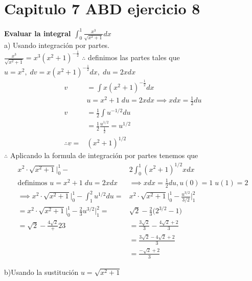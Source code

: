 \chapter*{Capitulo 7 ABD ejercicio 8}
\textbf{Evaluar la integral $\displaystyle\int_{0}^{1}\frac{x^3}{\sqrt{x^2+1}}dx$}\\
a) Usando integración por partes.\\
$\displaystyle\frac{x^3}{\sqrt{x^2+1}}=x^3(x^2+1)^{-\frac{1}{2}}$
$\therefore$ definimos las partes tales que
$u=x^2,\;dv=x(x^2+1)^{-\frac{1}{2}}dx,\;du = 2xdx $
\begin{align*}
	v             & =\int x(x^2+1)^{-\frac{1}{2}}dx                 \\
	              & u=x^2+1\; du=2xdx\implies xdx=\frac{1}{2}du     \\
	v             & =\frac{1}{2}\int u^{-1/2}du                     \\
	              & =\frac{1}{2}\frac{u^{1/2}}{\frac{1}{2}}=u^{1/2} \\
	\therefore v= & (x^2+1)^{1/2}
\end{align*}
$\therefore$ Aplicando la formula de integración por partes tenemos que
\begin{align*}
	x^2\cdot \sqrt{x^2 +1}\bigg|^1_0-                                & 2\int_{0}^{1}(x^2 +1)^{1/2}xdx                                 \\
	\text{definimos }u=x^2+1\; du=2xdx                               & \implies xdx=\frac{1}{2}du, u(0)=1\;u(1)=2                     \\
	\implies x^2\cdot \sqrt{x^2 +1}\bigg|^1_0-\int_{1}^{2}u^{1/2}du= & x^2\cdot \sqrt{x^2 +1}\bigg|^1_0-\frac{u^{3/2}}{3/2}\bigg|_1^2 \\
	=x^2\cdot \sqrt{x^2 +1}\bigg|^1_0-\frac{2}{3}u^{3/2}\bigg|_1^2=  & \sqrt{2}-\frac{2}{3}\bigg(2^{3/2}-1\bigg)                      \\
	=\sqrt{2}-\frac{4\sqrt{2}}+2{3}                                  & =\frac{3\sqrt{2}}{3}-\frac{4\sqrt{2}+2}{3}                     \\
	                                                                 & =\frac{3\sqrt{2}-4\sqrt{2}+2}{3}                               \\
	                                                                 & =\frac{-\sqrt{2}+2}{3}
\end{align*}

b)Usando la sustitución $\displaystyle u=\sqrt{x^2+1}$

